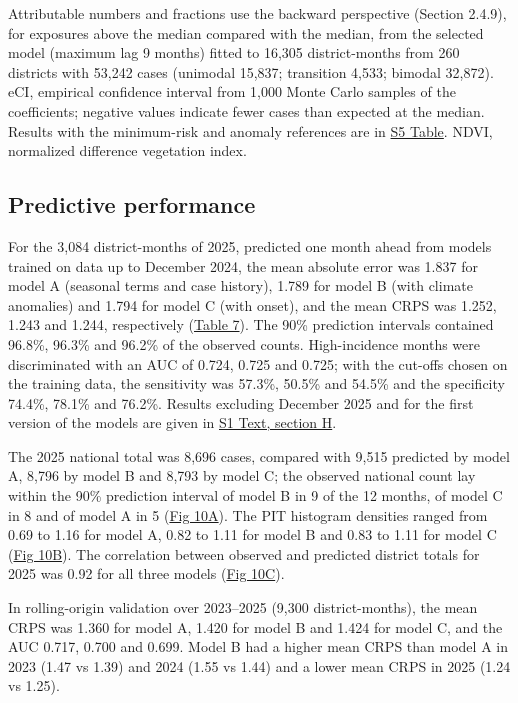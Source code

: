 \documentclass[11pt,a4paper]{article}
\begin{document}
\noindent Attributable numbers and fractions use the backward perspective (Section 2.4.9), for exposures above the median compared with the median, from the selected model (maximum lag 9 months) fitted to 16,305 district-months from 260 districts with 53,242 cases (unimodal 15,837; transition 4,533; bimodal 32,872). eCI, empirical confidence interval from 1,000 Monte Carlo samples of the coefficients; negative values indicate fewer cases than expected at the median. Results with the minimum-risk and anomaly references are in \hyperref[s5table]{S5 Table}. NDVI, normalized difference vegetation index.\par\endgroup
\medskip

\subsection{Predictive performance}

For the 3,084 district-months of 2025, predicted one month ahead from models trained on data up to December 2024, the mean absolute error was 1.837 for model A (seasonal terms and case history), 1.789 for model B (with climate anomalies) and 1.794 for model C (with onset), and the mean CRPS was 1.252, 1.243 and 1.244, respectively (\hyperref[table7]{Table 7}). The 90\% prediction intervals contained 96.8\%, 96.3\% and 96.2\% of the observed counts. High-incidence months were discriminated with an AUC of 0.724, 0.725 and 0.725; with the cut-offs chosen on the training data, the sensitivity was 57.3\%, 50.5\% and 54.5\% and the specificity 74.4\%, 78.1\% and 76.2\%. Results excluding December 2025 and for the first version of the models are given in \hyperref[s1text-h]{S1 Text, section H}.

The 2025 national total was 8,696 cases, compared with 9,515 predicted by model A, 8,796 by model B and 8,793 by model C; the observed national count lay within the 90\% prediction interval of model B in 9 of the 12 months, of model C in 8 and of model A in 5 (\hyperref[fig10]{Fig 10A}). The PIT histogram densities ranged from 0.69 to 1.16 for model A, 0.82 to 1.11 for model B and 0.83 to 1.11 for model C (\hyperref[fig10]{Fig 10B}). The correlation between observed and predicted district totals for 2025 was 0.92 for all three models (\hyperref[fig10]{Fig 10C}).

In rolling-origin validation over 2023--2025 (9,300 district-months), the mean CRPS was 1.360 for model A, 1.420 for model B and 1.424 for model C, and the AUC 0.717, 0.700 and 0.699. Model B had a higher mean CRPS than model A in 2023 (1.47 vs 1.39) and 2024 (1.55 vs 1.44) and a lower mean CRPS in 2025 (1.24 vs 1.25).
\end{document}
